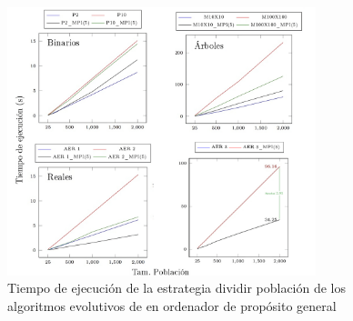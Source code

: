 \begin{figure}[!h]
	\centering
	\includegraphics[width=0.80\textwidth]{images/chapter_4/pev_1_1mpi}
	\caption{Tiempo de ejecución de la estrategia dividir población de los algoritmos evolutivos de en ordenador de propósito general}
	\label{fig:pev_mpi1_1}			
\end{figure}
\newpage

